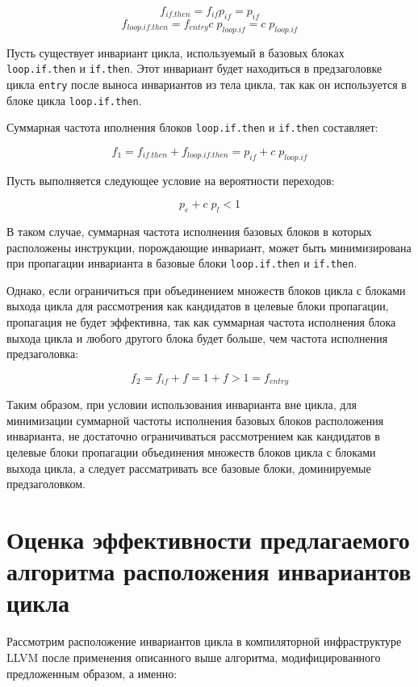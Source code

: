 $$ f_{if.then} = f_{if} p_{if} = p_{if} $$
$$ f_{loop.if.then} = f_{entry} c\; p_{loop.if} = c\; p_{loop.if} $$

Пусть существует инвариант цикла, используемый в базовых блоках \texttt{loop.if.then} и \texttt{if.then}.
Этот инвариант будет находиться в предзаголовке цикла \texttt{entry} после выноса инвариантов из тела цикла, так как он используется в блоке цикла \texttt{loop.if.then}.

Суммарная частота иполнения блоков \texttt{loop.if.then} и \texttt{if.then} составляет:

$$ f_1 = f_{if.then} + f_{loop.if.then} = p_{if} + c\; p_{loop.if} $$

Пусть выполняется следующее условие на вероятности переходов:

$$ p_e + c\; p_l < 1 $$

В таком случае, суммарная частота исполнения базовых блоков в которых расположены инструкции, порождающие инвариант, может быть минимизирована при пропагации инварианта в базовые блоки \texttt{loop.if.then} и \texttt{if.then}.

Однако, если ограничиться при объединением множеств блоков цикла с блоками выхода цикла для рассмотрения как кандидатов в целевые блоки пропагации, пропагация не будет эффективна, так как суммарная частота исполнения блока выхода цикла и любого другого блока будет больше, чем частота исполнения предзаголовка:

$$ f_2 = f_{if} + f = 1 + f > 1 = f_{entry} $$

Таким образом, при условии использования инварианта вне цикла, для минимизации суммарной частоты исполнения базовых блоков расположения инварианта, не достаточно ограничиваться рассмотрением как кандидатов в целевые блоки пропагации объединения множеств блоков цикла с блоками выхода цикла, а следует рассматривать все базовые блоки, доминируемые предзаголовком.

\section{Оценка эффективности предлагаемого алгоритма расположения инвариантов цикла}

Рассмотрим расположение инвариантов цикла в компиляторной инфраструктуре LLVM после применения описанного выше алгоритма, модифицированного предложенным образом, а именно:


